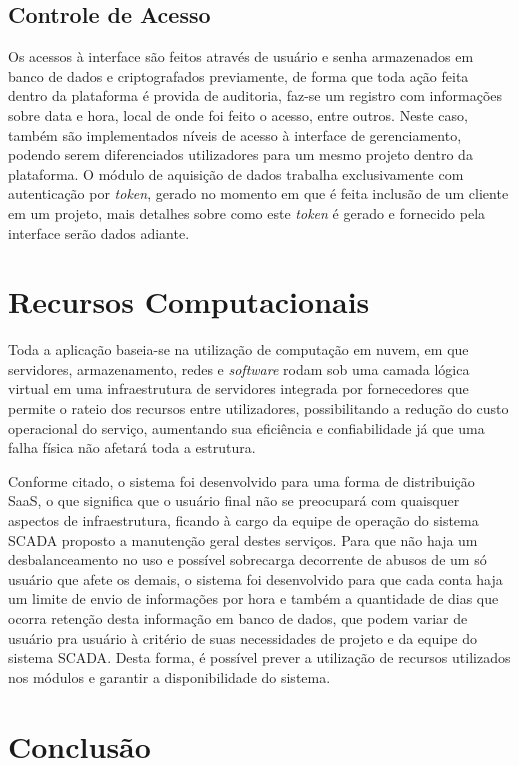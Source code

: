         \subsection{Controle de Acesso}
        \label{sec:controle-acesso}
        Os acessos à interface são feitos através de usuário e senha armazenados em banco de dados e criptografados previamente, de forma que toda ação feita dentro da plataforma é provida de auditoria, faz-se um registro com informações sobre data e hora, local de onde foi feito o acesso, entre outros. Neste caso, também são implementados níveis de acesso à interface de gerenciamento, podendo serem diferenciados utilizadores para um mesmo projeto dentro da plataforma. O módulo de aquisição de dados trabalha exclusivamente com autenticação por \textit{token}, gerado no momento em que é feita inclusão de um cliente em um projeto, mais detalhes sobre como este \textit{token} é gerado e fornecido pela interface serão dados adiante.
        
\section{Recursos Computacionais}
\label{sec:recursos-computacionais }
    Toda a aplicação baseia-se na utilização de computação em nuvem, em que servidores, armazenamento, redes e \textit{software} rodam sob uma camada lógica virtual em uma infraestrutura de servidores integrada por fornecedores que permite o rateio dos recursos entre utilizadores, possibilitando a redução do custo operacional do serviço, aumentando sua eficiência e confiabilidade já que uma falha física não afetará toda a estrutura.
    
    Conforme citado, o sistema foi desenvolvido para uma forma de distribuição \gls{SaaS}, o que significa que o usuário final não se preocupará com quaisquer aspectos de infraestrutura, ficando à cargo da equipe de operação do sistema \gls{SCADA} proposto a manutenção geral destes serviços. Para que não haja um desbalanceamento no uso e possível sobrecarga decorrente de abusos de um só usuário que afete os demais, o sistema foi desenvolvido para que cada conta haja um limite de envio de informações por hora e também a quantidade de dias que ocorra retenção desta informação em banco de dados, que podem variar de usuário pra usuário à critério de suas necessidades de projeto e da equipe do sistema \gls{SCADA}. Desta forma, é possível prever a utilização de recursos utilizados nos módulos e garantir a disponibilidade do sistema.
    
\section{Conclusão}
\label{sec:conclusao-sistema}